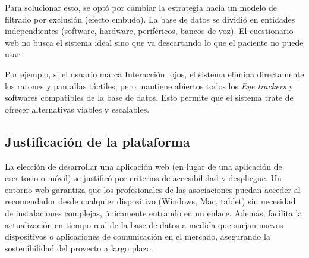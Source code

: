 Para solucionar esto, se optó por cambiar la estrategia hacia un modelo de filtrado por exclusión (efecto embudo). La base de datos se dividió en entidades independientes (software, hardware, periféricos, bancos de voz). El cuestionario web no busca el sistema ideal sino que va descartando lo que el paciente no puede usar. 

Por ejemplo, si el usuario marca Interacción: ojos, el sistema elimina directamente los ratones y pantallas táctiles, pero mantiene abiertos todos los \textit{Eye trackers} y softwares compatibles de la base de datos. Esto permite que el sistema trate de ofrecer alternativas viables y escalables.

\subsection{Justificación de la plataforma}
La elección de desarrollar una aplicación web (en lugar de una aplicación de escritorio o móvil) se justificó por criterios de accesibilidad y despliegue. Un entorno web garantiza que los profesionales de las asociaciones puedan acceder al recomendador desde cualquier dispositivo (Windows, Mac, tablet) sin necesidad de instalaciones complejas, únicamente entrando en un enlace. Además, facilita la actualización en tiempo real de la base de datos a medida que surjan nuevos dispositivos o aplicaciones de comunicación en el mercado, asegurando la sostenibilidad del proyecto a largo plazo.

